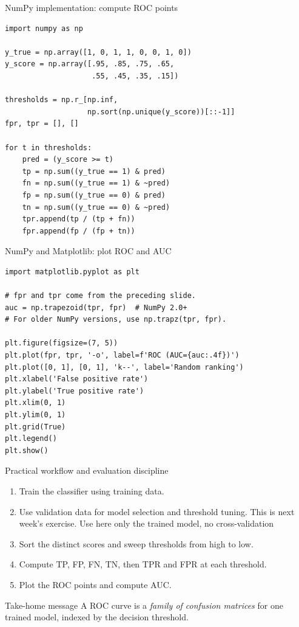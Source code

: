 \documentclass[aspectratio=169,11pt]{beamer}
\begin{document}
\begin{frame}[fragile]{NumPy implementation: compute ROC points}
\begin{lstlisting}
import numpy as np

y_true = np.array([1, 0, 1, 1, 0, 0, 1, 0])
y_score = np.array([.95, .85, .75, .65,
                    .55, .45, .35, .15])

thresholds = np.r_[np.inf,
                   np.sort(np.unique(y_score))[::-1]]
fpr, tpr = [], []

for t in thresholds:
    pred = (y_score >= t)
    tp = np.sum((y_true == 1) & pred)
    fn = np.sum((y_true == 1) & ~pred)
    fp = np.sum((y_true == 0) & pred)
    tn = np.sum((y_true == 0) & ~pred)
    tpr.append(tp / (tp + fn))
    fpr.append(fp / (fp + tn))
\end{lstlisting}
\end{frame}
\begin{frame}[fragile]{NumPy and Matplotlib: plot ROC and AUC}
\begin{lstlisting}
import matplotlib.pyplot as plt

# fpr and tpr come from the preceding slide.
auc = np.trapezoid(tpr, fpr)  # NumPy 2.0+
# For older NumPy versions, use np.trapz(tpr, fpr).

plt.figure(figsize=(7, 5))
plt.plot(fpr, tpr, '-o', label=f'ROC (AUC={auc:.4f})')
plt.plot([0, 1], [0, 1], 'k--', label='Random ranking')
plt.xlabel('False positive rate')
plt.ylabel('True positive rate')
plt.xlim(0, 1)
plt.ylim(0, 1)
plt.grid(True)
plt.legend()
plt.show()
\end{lstlisting}
\end{frame}
\begin{frame}{Practical workflow and evaluation discipline}
\begin{enumerate}
\item Train the classifier using training data.
\item Use validation data for model selection and threshold tuning. This is next week's exercise. Use here only the trained model, no cross-validation
\item Sort the distinct scores and sweep thresholds from high to low.
\item Compute TP, FP, FN, TN, then TPR and FPR at each threshold.
\item Plot the ROC points and compute AUC.
\end{enumerate}
\begin{block}{Take-home message}
A ROC curve is a \emph{family of confusion matrices} for one trained model, indexed by the decision threshold.
\end{block}
\end{frame}
\end{document}
